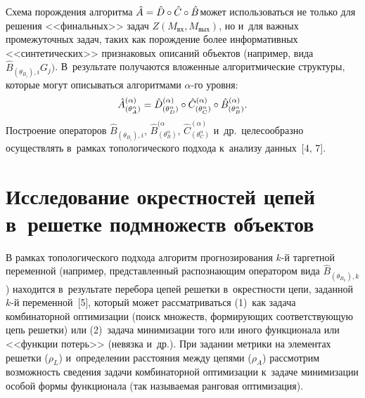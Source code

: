 \begin{multicols}{2}
     Схема порождения алгоритма $\hat{{A}} \hm= 
\hat{{D}}\circ \hat{{C}}\circ \hat{{B}}$\linebreak может 
использоваться не только для решения <<финальных>> задач 
$Z({M}_{\mathrm{вх}},{M}_{\mathrm{вых}})$, но и~для 
важных промежуточных задач, таких как порождение более информативных 
<<синтетических>> признаковых \mbox{описаний} объектов (например, вида 
$\hat{{B}}_{(\theta_{B_i}),i}G_j)$. В~результате получаются 
вложенные алгоритмические структуры, которые могут описываться 
алгоритмами $\alpha$-го уровня: 
$$
\hat{{A}}^{(\alpha)}_{(\theta^\alpha_A)} \hm= 
\hat{{D}}^{(\alpha)}_{(\theta^\alpha_D)} \circ 
\hat{{C}}^{(\alpha)}_{(\theta^\alpha_C)} \circ
     \hat{{B}}^{(\alpha)}_{(\theta^\alpha_B)}.
     $$
      Построение 
операторов $\hat{{B}}_{(\theta_{B_i}),i}$, 
$\hat{{B}}^{(\alpha}_{(\theta^\alpha_B)}$, 
$\hat{{C}}^{(\alpha)}_{(\theta_C^\alpha)}$ и~др.\ целесообразно 
осуществлять в~рамках топологического подхода к~анализу данных~[4, 7]. 

\section{Исследование окрестностей цепей в~решетке подмножеств 
объектов}
 
     В рамках топологического подхода алгоритм прогнозирования $k$-й 
таргетной переменной (например, представленный распознающим оператором 
вида $\hat{{B}}_{(\theta_{B_k}),k}$) находится в~результате перебора 
цепей решетки в~окрестности цепи, заданной $k$-й переменной~[5], который 
может рассматриваться (1)~как задача комбинаторной оптимизации (поиск 
множеств, формирующих соответствующую цепь решетки) или (2)~задача 
минимизации того или иного функционала или <<функции потерь>> (невязка 
и~др.). При задании метрики на элементах решетки ($\rho_L$) и~определении 
расстояния между цепями ($\rho_A$) рассмотрим возможность сведения задачи 
комбинаторной оптимизации к~задаче минимизации особой формы 
функционала (так называемая ранговая оптимизация).
     

\end{multicols}
